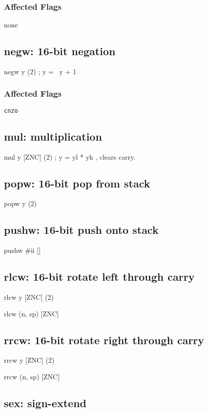\documentclass{book}
\begin{document}
\subsubsection*{Affected Flags}

none


\subsection{negw: 16-bit negation}

negw y (2)      ; y = ~y + 1

\subsubsection*{Affected Flags}

\texttt{cnzo}


\subsection{mul: multiplication}

mul y [ZNC] (2)        ; y = yl * yh , clears carry.


\subsection{popw: 16-bit pop from stack}

popw y (2)


\subsection{pushw: 16-bit push onto stack}

pushw \#ii []


\subsection{rlcw: 16-bit rotate left through carry}

rlcw y [ZNC] (2)

rlcw (n, sp) [ZNC]


\subsection{rrcw: 16-bit rotate right through carry}

rrcw y [ZNC] (2)

rrcw (n, sp) [ZNC]

\subsection{sex: sign-extend}
\end{document}

